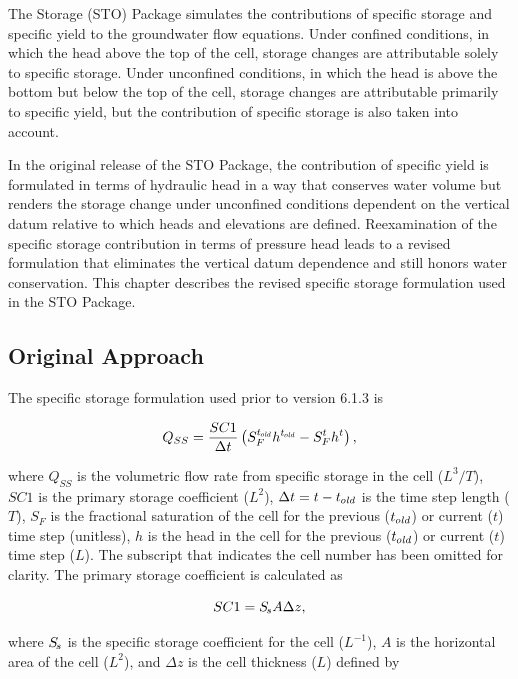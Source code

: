 The \mf Storage (STO) Package simulates the contributions of specific storage and specific yield to the groundwater flow equations. Under confined conditions, in which the head above the top of the cell, storage changes are attributable solely to specific storage. Under unconfined conditions, in which the head is above the bottom but below the top of the cell, storage changes are attributable primarily to specific yield, but the contribution of specific storage is also taken into account.

In the original release of the \mf STO Package, the contribution of specific yield is formulated in terms of hydraulic head in a way that conserves water volume but renders the storage change under unconfined conditions dependent on the vertical datum relative to which heads and elevations are defined. Reexamination of the specific storage contribution in terms of pressure head leads to a revised formulation that eliminates the vertical datum dependence and still honors water conservation. This chapter describes the revised specific storage formulation used in the \mf STO Package.

\subsection{Original Approach}

The specific storage formulation used prior to \mf version 6.1.3 is

\begin{equation}
	\label{eqn:STOeq-orig}
	Q_{SS} = \frac{SC1}{\Delta t} \left(S_{F}^{t_\mathit{\kern -0.07em old}} h^{t_\mathit{\kern -0.07em old}} -S_F^t h^{t} \right),
\end{equation}

\noindent where $Q_{SS}$ is the volumetric flow rate from specific storage in the cell ($L^3/T$), $SC1$ is the primary storage coefficient ($L^2$), $\Delta t = t - {t_\mathit{\kern -0.07em old}}$ is the time step length ($T$), $S_F$ is the fractional saturation of the cell for the previous (${t_\mathit{\kern -0.07em old}}$) or current ($t$) time step (unitless), $h$ is the head in the cell for the previous (${t_\mathit{\kern -0.07em old}}$) or current ($t$) time step ($L$). The subscript that indicates the cell number has been omitted for clarity. The primary storage coefficient is calculated as 

\begin{equation}
	\label{eqn:STOeq-sc1}
	SC1 = {S_{\kern -.1em s}} A \Delta z,
\end{equation}

\noindent where ${S_{\kern -.1em s}}$ is the specific storage coefficient for the cell ($L^{-1}$), $A$ is the horizontal area of the cell ($L^2$), and $\Delta z$ is the cell thickness ($L$) defined by


